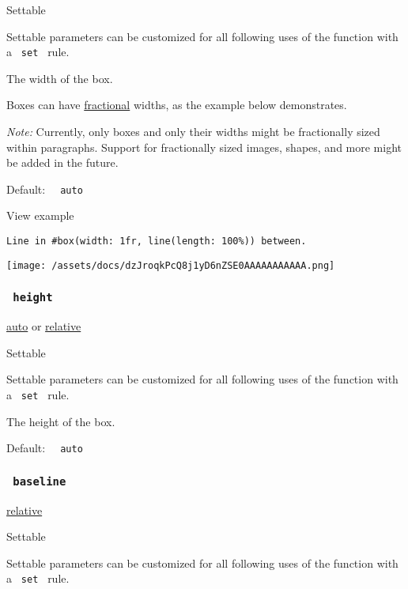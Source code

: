 {{ Settable }}

\label{parameters-width-settable-tooltip}
Settable parameters can be customized for all following uses of the
function with a \texttt{\ set\ } rule.

The width of the box.

Boxes can have \href{/docs/reference/layout/fraction/}{fractional}
widths, as the example below demonstrates.

\emph{Note:} Currently, only boxes and only their widths might be
fractionally sized within paragraphs. Support for fractionally sized
images, shapes, and more might be added in the future.

Default: \texttt{\ }{\texttt{\ auto\ }}\texttt{\ }


View example

\begin{verbatim}
Line in #box(width: 1fr, line(length: 100%)) between.
\end{verbatim}

\texttt{[image: /assets/docs/dzJroqkPcQ8j1yD6nZSE0AAAAAAAAAAA.png]}

\subsubsection{\texorpdfstring{\texttt{\ height\ }}{ height }}\label{parameters-height}

\href{/docs/reference/foundations/auto/}{auto} {or}
\href{/docs/reference/layout/relative/}{relative}

{{ Settable }}

\label{parameters-height-settable-tooltip}
Settable parameters can be customized for all following uses of the
function with a \texttt{\ set\ } rule.

The height of the box.

Default: \texttt{\ }{\texttt{\ auto\ }}\texttt{\ }

\subsubsection{\texorpdfstring{\texttt{\ baseline\ }}{ baseline }}\label{parameters-baseline}

\href{/docs/reference/layout/relative/}{relative}

{{ Settable }}

\label{parameters-baseline-settable-tooltip}
Settable parameters can be customized for all following uses of the
function with a \texttt{\ set\ } rule.

